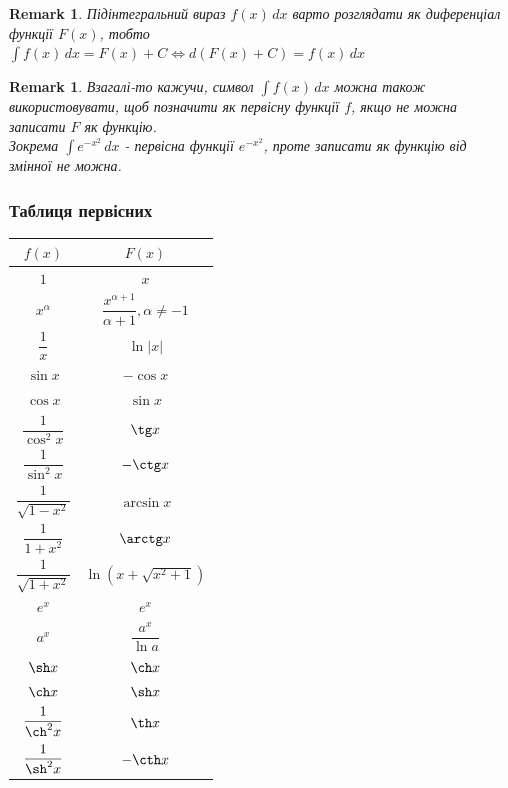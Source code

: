 \documentclass[a4paper, 10pt]{article}
\def\huge{\displaystyle}
\theoremstyle{theoremdd}
\theoremstyle{theoremdd}
\theoremstyle{theoremdd}
\theoremstyle{theoremdd}
\theoremstyle{theoremdd}
\theoremstyle{theoremdd}
\theoremstyle{theoremdd}
\newtheorem{remark}[theorem]{Remark}
\theoremstyle{theoremdd}
\theoremstyle{theoremdd}
\begin{document}
\begin{remark}
Підінтегральний вираз $f(x)\,dx$ варто розглядати як диференціал функції $F(x)$, тобто\\
$\huge\int f(x)\,dx = F(x) + C \iff d(F(x)+C) = f(x)\,dx$
\end{remark}

\begin{remark}
Взагалі-то кажучи, символ $\huge\int f(x)\,dx$ можна також використовувати, щоб позначити як первісну функції $f$, якщо не можна записати $F$ як функцію.\\
Зокрема $\huge\int e^{-x^2}\,dx$ - первісна функції $e^{-x^2}$, проте записати як функцію від змінної не можна.
\end{remark}

\subsubsection*{Таблиця первісних}
\begin{center}
\begin{tabular}{ c|c } 
 $f(x)$ & $F(x)$ \\
 \hline 
 $1$ & $x$ \\ [2ex]
 \hline 
 $x^\alpha$ & $\dfrac{x^{\alpha+1}}{\alpha+1}, \alpha \neq -1$ \\ [2ex]
 \hline
 $\dfrac{1}{x}$ & $\ln |x|$ \\ [2ex]
 \hline
 $\sin x$ & $-\cos x$\\ [2ex]
 \hline 
 $\cos x$ & $\sin x$\\ [2ex]
 \hline
 $\dfrac{1}{\cos^2 x}$ & $\tg x$\\ [2ex]
 \hline 
 $\dfrac{1}{\sin^2 x}$ & $-\ctg x$\\ [2ex]
 \hline
 $\dfrac{1}{\sqrt{1-x^2}}$ & $\arcsin x$\\ [2ex]
 \hline
 $\dfrac{1}{1+x^2}$ & $\arctg x$\\ [2ex]
 \hline
 $\dfrac{1}{\sqrt{1+x^2}}$ & $\ln(x+\sqrt{x^2+1})$\\ [2ex]
 \hline
 $e^x$ & $e^x$ \\ [2ex]
 \hline 
 $a^x$ & $\dfrac{a^x}{\ln a}$ \\ [2ex]
 \hline
 $\sh x$ & $\ch x$ \\ [2ex]
 \hline
 $\ch x$ & $\sh x$ \\ [2ex]
 \hline
 $\dfrac{1}{\ch^2 x}$ & $\th x$\\ [2ex]
 \hline
 $\dfrac{1}{\sh^2 x}$ & $-\cth x$\\
\end{tabular}
\end{center}
\end{document}
